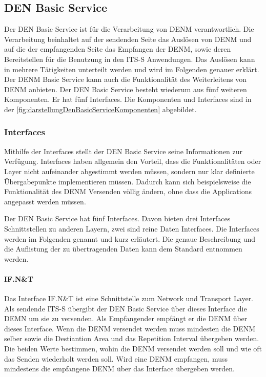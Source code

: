 \subsection{DEN Basic Service}
Der \ac{DEN} Basic Service ist für die Verarbeitung von \ac{DENM} verantwortlich. Die Verarbeitung beinhaltet auf der sendenden Seite das Auslösen von \ac{DENM} und auf die der empfangenden Seite das Empfangen der \ac{DENM}, sowie deren Bereitstellen für die Benutzung in den \ac{ITS-S} Anwendungen. Das Auslösen kann in mehrere Tätigkeiten unterteilt werden und wird im Folgenden genauer erklärt. Der \ac{DENM} Basic Service kann auch die Funktionalität des Weiterleitens von \ac{DENM} anbieten. Der \ac{DEN} Basic Service besteht wiederum aus fünf weiteren Komponenten. Er hat fünf Interfaces. Die Komponenten und Interfaces sind in der \autoref{fig:darstellungDenBasicServiceKomponenten} abgebildet.

\subsubsection{Interfaces}
Mithilfe der Interfaces stellt der \ac{DEN} Basic Service seine Informationen zur Verfügung. Interfaces haben allgemein den Vorteil, dass die Funktionalitäten oder Layer nicht aufeinander abgestimmt werden müssen, sondern nur klar definierte Übergabepunkte implementieren müssen. Dadurch kann sich beispielsweise die Funktionalität des \ac{DENM} Versenden völlig ändern, ohne dass die Applications angepasst werden müssen. 

Der \ac{DEN} Basic Service hat fünf Interfaces. Davon bieten drei Interfaces Schnittstellen zu anderen Layern, zwei sind reine Daten Interfaces. Die Interfaces werden im Folgenden genannt und kurz erläutert. Die genaue Beschreibung und die Auflistung der zu übertragenden Daten  kann dem Standard \cite{en302637-3} entnommen werden.

\paragraph{IF.N\&T}
Das Interface IF.N\&T ist  eine Schnittstelle zum Network und Transport Layer. Als sendende \ac{ITS-S} übergibt der \ac{DEN} Basic Service über dieses Interface die \ac{DEMN} um sie zu versenden. Als Empfangender empfängt er die \ac{DENM} über dieses Interface. Wenn die \ac{DENM} versendet werden muss mindesten die \ac{DENM} selber sowie die Destiantion Area und das Repetition Interval übergeben werden. Die beiden Werte bestimmen, wohin die \ac{DENM} versendet werden soll und wie oft das Senden wiederholt werden soll. Wird eine \ac{DENM} empfangen, muss mindestens die empfangene  \ac{DENM} über das Interface übergeben werden.

